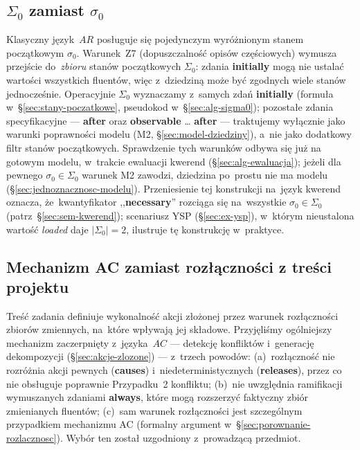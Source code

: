 \documentclass[11pt,a4paper]{article}
\newif\ifshowbib
\newcommand{\bibonly}[1]{\ifshowbib#1\fi}
\renewcommand{\cite}[2][]{\unskip}%
\newcommand{\causes}{\textbf{causes}}
\newcommand{\aft}{\textbf{after}}
\newcommand{\initially}{\textbf{initially}}
\newcommand{\always}{\textbf{always}}
\newcommand{\releases}{\textbf{releases}}
\newcommand{\observable}{\textbf{observable}}
\newcommand{\necessary}{\textbf{necessary}}
\theoremstyle{definition}
\begin{document}
\subsection{\texorpdfstring{$\Sigma_0$}{Sigma0} zamiast \texorpdfstring{$\sigma_0$}{sigma0}}
\label{sec:decyzja-sigma0}

Klasyczny język~$AR$ posługuje się pojedynczym wyróżnionym stanem początkowym $\sigma_0$. Warunek~Z7 (dopuszczalność opisów częściowych) wymusza przejście do~\emph{zbioru} stanów początkowych $\Sigma_0$: zdania \initially{} mogą nie ustalać wartości wszystkich fluentów, więc z~dziedziną może być zgodnych wiele stanów jednocześnie. Operacyjnie $\Sigma_0$ wyznaczamy z~samych zdań \initially{} (formuła w~§\ref{sec:stany-poczatkowe}, pseudokod w~§\ref{sec:alg-sigma0}); pozostałe zdania specyfikacyjne --- \aft{} oraz \observable{} \ldots{} \aft{} --- traktujemy wyłącznie jako warunki poprawności modelu (M2, §\ref{sec:model-dziedziny}), a~nie jako dodatkowy filtr stanów początkowych. Sprawdzenie tych warunków odbywa się już na gotowym modelu, w~trakcie ewaluacji kwerend (§\ref{sec:alg-ewaluacja}); jeżeli dla pewnego $\sigma_0 \in \Sigma_0$ warunek M2 zawodzi, dziedzina po~prostu nie ma modelu (§\ref{sec:jednoznacznosc-modelu}). Przeniesienie tej konstrukcji na~język kwerend oznacza, że~kwantyfikator ,,\necessary{}'' rozciąga się na~wszystkie $\sigma_0 \in \Sigma_0$ (patrz~§\ref{sec:sem-kwerend}); scenariusz YSP (§\ref{sec:ex-ysp}), w~którym nieustalona wartość \textit{loaded} daje $|\Sigma_0|=2$, ilustruje tę konstrukcję w~praktyce.

\subsection{Mechanizm AC zamiast rozłączności z treści projektu}
\label{sec:decyzja-ac}

Treść zadania\bibonly{~\cite{projekt4}} definiuje wykonalność akcji złożonej przez warunek rozłączności zbiorów zmiennych, na~które wpływają jej składowe. Przyjęliśmy ogólniejszy mechanizm zaczerpnięty z~języka~$AC$ --- detekcję konfliktów i~generację dekompozycji (§\ref{sec:akcje-zlozone}) --- z~trzech powodów: (a)~rozłączność nie rozróżnia akcji pewnych (\causes{}) i~niedeterministycznych (\releases{}), przez co nie obsługuje poprawnie Przypadku~2 konfliktu; (b)~nie uwzględnia ramifikacji wymuszanych zdaniami \always{}, które mogą rozszerzyć faktyczny zbiór zmienianych fluentów; (c)~sam warunek rozłączności jest szczególnym przypadkiem mechanizmu AC (formalny argument w~§\ref{sec:porownanie-rozlacznosc}). Wybór ten został uzgodniony z~prowadzącą przedmiot.
\end{document}
